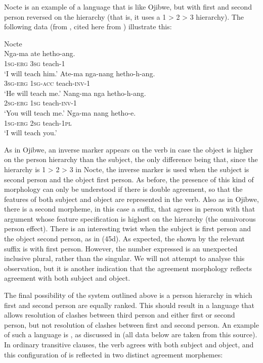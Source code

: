 \documentclass[output=paper]{langsci/langscibook}
\begin{document}
Nocte is an example of a language that is like Ojibwe, but with first and second person reversed on the hierarchy (that is, it uses a 1 > 2 > 3 hierarchy). The following data (from \citealt[641]{DeLancey1981}, cited here from \citealt[172]{Croft2003}) illustrate this:

\ea \label{bkm:Ref328735211}  Nocte\\
\ea\gll  Nga-ma  ate  hetho-ang.  \\
    \textsc{1sg-erg} \textsc{3sg} teach-\textsc{1}\\
\glt    ‘I will teach him.’
\ex \gll  Ate-ma   nga-nang hetho-h-ang.\\
      \textsc{3sg-erg} \textsc{1sg-acc} teach-\textsc{inv-1}\\
\glt     ‘He will teach me.’
\ex \gll Nang-ma nga hetho-h-ang.\\
      \textsc{2sg-erg}  \textsc{1sg} teach-\textsc{inv-1}\\
\glt     ‘You will teach me.’
\ex \gll Nga-ma  nang hetho-e.\\
     \textsc{1sg}-\textsc{erg} \textsc{2sg} teach-\textsc{1pl}\\
\glt    ‘I will teach you.’
\z \z

As in Ojibwe, an inverse marker appears on the verb in case the object is higher on the person hierarchy than the subject, the only difference being that, since the hierarchy is 1 > 2 > 3 in Nocte, the inverse marker is used when the subject is second person and the object first person.  As before, the presence of this kind of morphology can only be understood if there is double agreement, so that the features of both subject and object are represented in the verb. Also as in Ojibwe, there is a second morpheme, in this case a suffix, that agrees in person with that argument whose feature specification is highest on the hierarchy (the omnivorous person effect). There is an interesting twist when the subject is first person and the object second person, as in (45d). As expected, the  shown by the relevant suffix is with first person. However, the number expressed is an unexpected inclusive plural, rather than the singular. We will not attempt to analyse this observation, but it is another indication that the agreement morphology reflects agreement with both subject and object.

The final possibility of the system outlined above is a person hierarchy in which first and second person are equally ranked. This should result in a language that allows resolution of clashes between third person and either first or second person, but not resolution of clashes between first and second person. An example of such a language is , as discussed in \citet{Preminger2014} (all  data below are taken from this source). In ordinary transitive clauses, the verb agrees with both subject and object, and this configuration of  is reflected in two distinct agreement morphemes:
\end{document}

